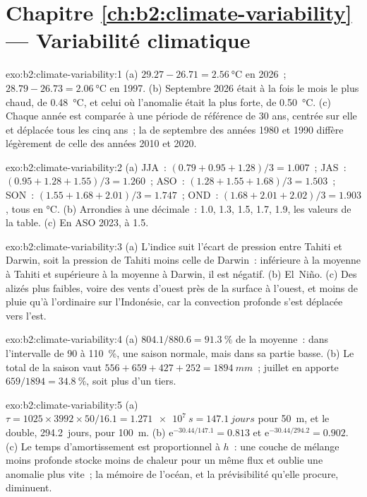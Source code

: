 \section*{Chapitre \ref{ch:b2:climate-variability} --- Variabilité climatique}

\begin{solution}{exo:b2:climate-variability:1}
(a) $29.27 - 26.71 = \qty{2.56}{\celsius}$ en 2026~; $28.79 - 26.73 = \qty{2.06}{\celsius}$ en 1997.
(b) Septembre 2026 était à la fois le mois le plus chaud, de \qty{0.48}{\celsius}, et celui où l'anomalie était la plus forte,
de \qty{0.50}{\celsius}. (c) Chaque année est comparée à une période de référence de 30 ans, centrée sur elle et déplacée
tous les cinq ans~; la  de septembre des années 1980 et 1990 diffère légèrement
de celle des années 2010 et 2020.
\end{solution}

\begin{solution}{exo:b2:climate-variability:2}
(a) JJA~: $(0.79 + 0.95 + 1.28)/3 = 1.007$~; JAS~: $(0.95 + 1.28 + 1.55)/3 = 1.260$~; ASO~: $(1.28 +
1.55 + 1.68)/3 = 1.503$~; SON~: $(1.55 + 1.68 + 2.01)/3 = 1.747$~; OND~: $(1.68 + 2.01 + 2.02)/3 =
1.903$, tous en \unit{\celsius}. (b) Arrondies à une décimale~: 1.0, 1.3, 1.5, 1.7, 1.9, les valeurs de
la table. (c) En ASO 2023, à 1.5.
\end{solution}

\begin{solution}{exo:b2:climate-variability:3}
(a) L'indice suit l'écart de pression entre Tahiti et Darwin, soit la pression de Tahiti moins celle de Darwin~:
inférieure à la moyenne à Tahiti et supérieure à la moyenne à Darwin, il est négatif. (b) El~Niño. (c) Des alizés plus
faibles, voire des vents d'ouest près de la surface à l'ouest, et moins de pluie qu'à l'ordinaire sur l'Indonésie,
car la convection profonde s'est déplacée vers l'est.
\end{solution}

\begin{solution}{exo:b2:climate-variability:4}
(a) $804.1/880.6 = \qty{91.3}{\percent}$ de la moyenne~: dans l'intervalle de 90 à \qty{110}{\percent}, une saison normale,
mais dans sa partie basse. (b) Le total de la saison vaut $556 + 659 + 427 + 252 =
\qty{1894}{mm}$~; juillet en apporte $659/1894 = \qty{34.8}{\percent}$, soit plus d'un tiers.
\end{solution}

\begin{solution}{exo:b2:climate-variability:5}
(a) $\tau = 1025 \times 3992 \times 50/16.1 = \qty{1.271e7}{s} = \qty{147.1}{jours}$ pour
\qty{50}{m}, et le double, \qty{294.2}{jours}, pour \qty{100}{m}. (b) $\mathrm{e}^{-30.44/147.1} =
0.813$ et $\mathrm{e}^{-30.44/294.2} = 0.902$. (c) Le temps d'amortissement est proportionnel à $h$~: une couche de
mélange moins profonde stocke moins de chaleur pour un même flux et oublie une anomalie plus vite~; la mémoire de l'océan,
et la prévisibilité qu'elle procure, diminuent.
\end{solution}

